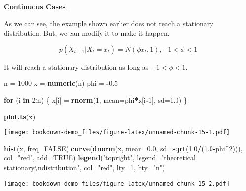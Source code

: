 \documentclass[]{book}
\newenvironment{Shaded}{\begin{snugshade}}{\end{snugshade}}
\newcommand{\KeywordTok}[1]{\textcolor[rgb]{0.13,0.29,0.53}{\textbf{#1}}}
\newcommand{\DataTypeTok}[1]{\textcolor[rgb]{0.13,0.29,0.53}{#1}}
\newcommand{\DecValTok}[1]{\textcolor[rgb]{0.00,0.00,0.81}{#1}}
\newcommand{\FloatTok}[1]{\textcolor[rgb]{0.00,0.00,0.81}{#1}}
\newcommand{\CharTok}[1]{\textcolor[rgb]{0.31,0.60,0.02}{#1}}
\newcommand{\StringTok}[1]{\textcolor[rgb]{0.31,0.60,0.02}{#1}}
\newcommand{\OtherTok}[1]{\textcolor[rgb]{0.56,0.35,0.01}{#1}}
\newcommand{\ControlFlowTok}[1]{\textcolor[rgb]{0.13,0.29,0.53}{\textbf{#1}}}
\newcommand{\OperatorTok}[1]{\textcolor[rgb]{0.81,0.36,0.00}{\textbf{#1}}}
\newcommand{\NormalTok}[1]{#1}
\begin{document}
\textbf{Continuous Cases}\_

As we can see, the example shown earlier does not reach a stationary
distribution. But, we can modify it to make it happen.

\[p(X_{t+1}|X_t=x_t)=N(\phi x_t,1), -1<\phi<1\]

It will reach a stationary distribution as long as \(-1<\phi<1\).

\begin{Shaded}
\begin{Highlighting}[]
\NormalTok{n =}\StringTok{ }\DecValTok{1000}
\NormalTok{x =}\StringTok{ }\KeywordTok{numeric}\NormalTok{(n)}
\NormalTok{phi =}\StringTok{ }\OperatorTok{-}\FloatTok{0.5}

\ControlFlowTok{for}\NormalTok{ (i }\ControlFlowTok{in} \DecValTok{2}\OperatorTok{:}\NormalTok{n) \{}
\NormalTok{  x[i] =}\StringTok{ }\KeywordTok{rnorm}\NormalTok{(}\DecValTok{1}\NormalTok{, }\DataTypeTok{mean=}\NormalTok{phi}\OperatorTok{*}\NormalTok{x[i}\OperatorTok{-}\DecValTok{1}\NormalTok{], }\DataTypeTok{sd=}\FloatTok{1.0}\NormalTok{)}
\NormalTok{\}}

\KeywordTok{plot.ts}\NormalTok{(x)}
\end{Highlighting}
\end{Shaded}

\texttt{[image: bookdown-demo\_files/figure-latex/unnamed-chunk-15-1.pdf]}

\begin{Shaded}
\begin{Highlighting}[]
\KeywordTok{hist}\NormalTok{(x, }\DataTypeTok{freq=}\OtherTok{FALSE}\NormalTok{)}
\KeywordTok{curve}\NormalTok{(}\KeywordTok{dnorm}\NormalTok{(x, }\DataTypeTok{mean=}\FloatTok{0.0}\NormalTok{, }\DataTypeTok{sd=}\KeywordTok{sqrt}\NormalTok{(}\FloatTok{1.0}\OperatorTok{/}\NormalTok{(}\FloatTok{1.0}\OperatorTok{-}\NormalTok{phi}\OperatorTok{^}\DecValTok{2}\NormalTok{))), }\DataTypeTok{col=}\StringTok{"red"}\NormalTok{, }\DataTypeTok{add=}\OtherTok{TRUE}\NormalTok{)}
\KeywordTok{legend}\NormalTok{(}\StringTok{"topright"}\NormalTok{, }\DataTypeTok{legend=}\StringTok{"theoretical stationary}\CharTok{\textbackslash{}n}\StringTok{distribution"}\NormalTok{, }\DataTypeTok{col=}\StringTok{"red"}\NormalTok{, }\DataTypeTok{lty=}\DecValTok{1}\NormalTok{, }\DataTypeTok{bty=}\StringTok{"n"}\NormalTok{)}
\end{Highlighting}
\end{Shaded}

\texttt{[image: bookdown-demo\_files/figure-latex/unnamed-chunk-15-2.pdf]}
\end{document}
